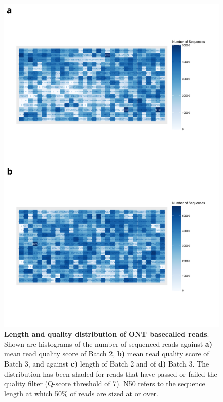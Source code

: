 \begin{figure}[htp]
	\begin{center}
		\includegraphics[page=3,trim={0 0cm 0cm 10cm},clip, scale = 0.45]{Figures/ONTTargetedTranscriptome.pdf}
	\end{center}
	\captionsetup{width=0.95\textwidth}
	\caption[ONT read length and quality from Whole Transcriptome Sequencing ]%
	{\textbf{Length and quality distribution of ONT basecalled reads}. Shown are histograms of the number of sequenced reads against \textbf{a)} mean read quality score of Batch 2, \textbf{b)} mean read quality score of Batch 3, and against \textbf{c)} length of Batch 2 and of \textbf{d)} Batch 3. The distribution has been shaded for reads that have passed or failed the quality filter (Q-score threshold of 7). N50 refers to the sequence length at which 50\% of reads are sized at or over. }
	\label{fig:ont_targetedlengthquality}
\end{figure}

